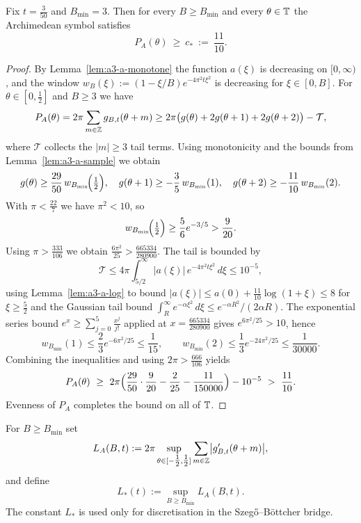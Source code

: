 \begin{lemma}\label{lem:uniform-arch-floor}
Fix $t=\frac{3}{50}$ and $B_{\min}=3$. Then for every $B\ge B_{\min}$ and every
$\theta\in\mathbb T$ the Archimedean symbol satisfies
\[
  P_A(\theta)\ \ge\ c_*\ :=\ \frac{11}{10}.
\]
\end{lemma}
\begin{proof}
By Lemma~\ref{lem:a3-a-monotone} the function $a(\xi)$ is decreasing on $[0,\infty)$, and the window
\(
  w_B(\xi):=(1-\xi/B)e^{-4\pi^2 t\xi^2}
\)
is decreasing for $\xi\in[0,B]$.  For $\theta\in[0,\tfrac12]$ and $B\ge3$ we have
\[
  P_A(\theta)=2\pi\sum_{m\in\mathbb Z} g_{B,t}(\theta+m)
  \ge 2\pi\bigl(g(\theta)+2g(\theta+1)+2g(\theta+2)\bigr) - \mathcal T,
\]
where $\mathcal T$ collects the $|m|\ge3$ tail terms.  Using monotonicity and the bounds
from Lemma~\ref{lem:a3-a-sample} we obtain
\[
  g(\theta)\ge \frac{29}{50}\,w_{B_{\min}}\!\Bigl(\tfrac12\Bigr),\quad
  g(\theta+1)\ge -\frac{3}{5}\,w_{B_{\min}}(1),\quad
  g(\theta+2)\ge -\frac{11}{10}\,w_{B_{\min}}(2).
\]
With $\pi<\tfrac{22}{7}$ we have $\pi^2<10$, so
\[
  w_{B_{\min}}\!\Bigl(\tfrac12\Bigr)
  \ge \frac{5}{6}e^{-3/5}
  >\frac{9}{20}.
\]
Using $\pi>\tfrac{333}{106}$ we obtain
\(
  \frac{6\pi^2}{25}>\frac{665334}{280900}.
\)
The tail is bounded by
\[
  \mathcal T \le 4\pi\int_{5/2}^{\infty}\!|a(\xi)|\,e^{-4\pi^2 t\xi^2}\,d\xi
  \le 10^{-5},
\]
using Lemma~\ref{lem:a3-a-log} to bound $|a(\xi)|\le a(0)+\tfrac{11}{10}\log(1+\xi)\le 8$ for $\xi\ge\tfrac52$
and the Gaussian tail bound $\int_{R}^{\infty}e^{-\alpha \xi^2}\,d\xi\le e^{-\alpha R^2}/(2\alpha R)$.
The exponential series bound
\(
  e^{x}\ge \sum_{j=0}^{5}\frac{x^j}{j!}
\)
applied at \(x=\frac{665334}{280900}\) gives \(e^{6\pi^2/25}>10\), hence
\[
  w_{B_{\min}}(1)\le \frac{2}{3}e^{-6\pi^2/25}\le \frac{1}{15},\qquad
  w_{B_{\min}}(2)\le \frac{1}{3}e^{-24\pi^2/25}\le \frac{1}{30000}.
\]
Combining the inequalities and using \(2\pi>\tfrac{666}{106}\) yields
\[
  P_A(\theta)\ \ge\ 2\pi\Bigl(\frac{29}{50}\cdot\frac{9}{20}-\frac{2}{25}-\frac{11}{150000}\Bigr)-10^{-5}
  \ >\ \frac{11}{10}.
\]
Evenness of $P_A$ completes the bound on all of $\mathbb T$.
\end{proof}

\begin{definition}\label{def:uniform-L}
For $B\ge B_{\min}$ set
\[
  L_A(B,t)
  := 2\pi\sup_{\theta\in[-\tfrac12,\tfrac12]}
      \sum_{m\in\mathbb Z}\bigl|g_{B,t}'(\theta+m)\bigr|,
\]
and define
\[
  L_*(t) := \sup_{B\ge B_{\min}}L_A(B,t).
\]
The constant $L_*$ is used only for discretisation in the Szeg\H{o}--B\"ottcher bridge.
\end{definition}

